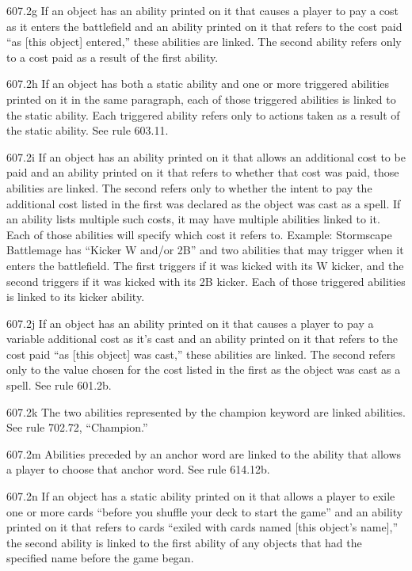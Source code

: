 607.2g If an object has an ability printed on it that causes a player to pay a cost as it enters the battlefield and an ability printed on it that refers to the cost paid “as [this object] entered,” these abilities are linked. The second ability refers only to a cost paid as a result of the first ability.

607.2h If an object has both a static ability and one or more triggered abilities printed on it in the same paragraph, each of those triggered abilities is linked to the static ability. Each triggered ability refers only to actions taken as a result of the static ability. See rule 603.11.

607.2i If an object has an ability printed on it that allows an additional cost to be paid and an ability printed on it that refers to whether that cost was paid, those abilities are linked. The second refers only to whether the intent to pay the additional cost listed in the first was declared as the object was cast as a spell. If an ability lists multiple such costs, it may have multiple abilities linked to it. Each of those abilities will specify which cost it refers to.
Example: Stormscape Battlemage has “Kicker {W} and/or {2}{B}” and two abilities that may trigger when it enters the battlefield. The first triggers if it was kicked with its {W} kicker, and the second triggers if it was kicked with its {2}{B} kicker. Each of those triggered abilities is linked to its kicker ability.

607.2j If an object has an ability printed on it that causes a player to pay a variable additional cost as it’s cast and an ability printed on it that refers to the cost paid “as [this object] was cast,” these abilities are linked. The second refers only to the value chosen for the cost listed in the first as the object was cast as a spell. See rule 601.2b.

607.2k The two abilities represented by the champion keyword are linked abilities. See rule 702.72, “Champion.”

607.2m Abilities preceded by an anchor word are linked to the ability that allows a player to choose that anchor word. See rule 614.12b.

607.2n If an object has a static ability printed on it that allows a player to exile one or more cards “before you shuffle your deck to start the game” and an ability printed on it that refers to cards “exiled with cards named [this object’s name],” the second ability is linked to the first ability of any objects that had the specified name before the game began.


